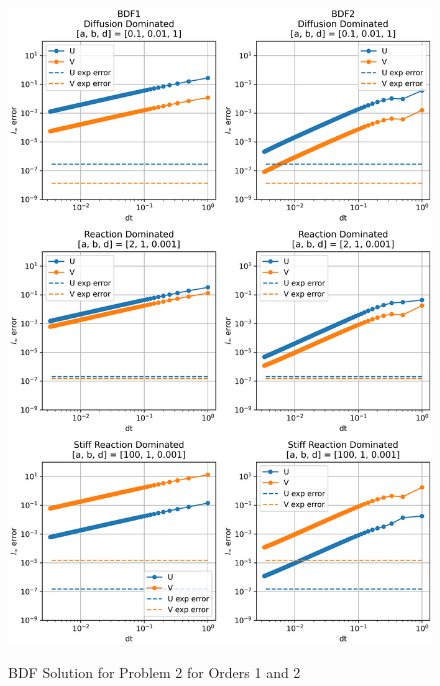 \begin{figure}[t]
  \centering
  \includegraphics[width=5.75in]{images/BDF1BDF2problem2.png}\\
  \caption{BDF Solution for Problem 2 for Orders 1 and 2}
  \label{fig:errorProblem2BDF1and2}
\end{figure} 

